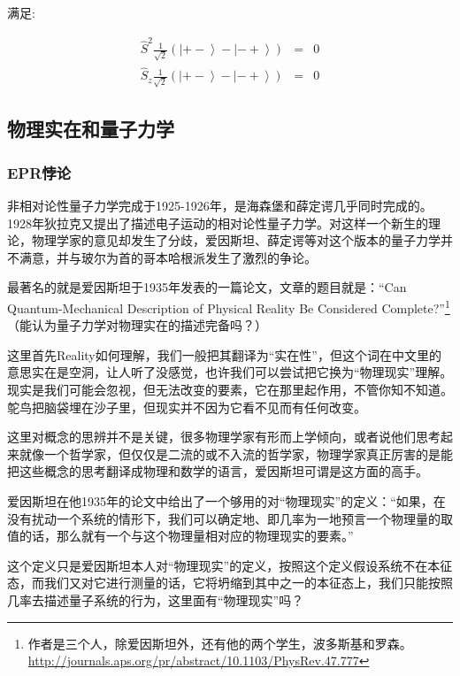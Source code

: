 满足:

\begin{eqnarray*}
  \hat S^2 \frac{1}{\sqrt 2}\left( \left|
{+-} \right\rangle - \left| {-+} \right\rangle \right) &=& 0 \\
  \hat S_z \frac{1}{\sqrt 2}\left( \left|
{+-} \right\rangle - \left| {-+} \right\rangle \right) &=& 0
\end{eqnarray*}


\subsection{物理实在和量子力学}

\subsubsection{EPR悖论}

非相对论性量子力学完成于1925-1926年，是海森堡和薛定谔几乎同时完成的。1928年狄拉克又提出了描述电子运动的相对论性量子力学。对这样一个新生的理论，物理学家的意见却发生了分歧，爱因斯坦、薛定谔等对这个版本的量子力学并不满意，并与玻尔为首的哥本哈根派发生了激烈的争论。

最著名的就是爱因斯坦于1935年发表的一篇论文，文章的题目就是：“Can Quantum-Mechanical Description of Physical Reality Be Considered Complete?”\footnote{作者是三个人，除爱因斯坦外，还有他的两个学生，波多斯基和罗森。\url{http://journals.aps.org/pr/abstract/10.1103/PhysRev.47.777}}（能认为量子力学对物理实在的描述完备吗？）

这里首先Reality如何理解，我们一般把其翻译为“实在性”，但这个词在中文里的意思实在是空洞，让人听了没感觉，也许我们可以尝试把它换为“物理现实”理解。现实是我们可能会忽视，但无法改变的要素，它在那里起作用，不管你知不知道。鸵鸟把脑袋埋在沙子里，但现实并不因为它看不见而有任何改变。

这里对概念的思辨并不是关键，很多物理学家有形而上学倾向，或者说他们思考起来就像一个哲学家，但仅仅是二流的或不入流的哲学家，物理学家真正厉害的是能把这些概念的思考翻译成物理和数学的语言，爱因斯坦可谓是这方面的高手。

爱因斯坦在他1935年的论文中给出了一个够用的对“物理现实”的定义：“如果，在没有扰动一个系统的情形下，我们可以确定地、即几率为一地预言一个物理量的取值的话，那么就有一个与这个物理量相对应的物理现实的要素。”

这个定义只是爱因斯坦本人对“物理现实”的定义，按照这个定义假设系统不在本征态，而我们又对它进行测量的话，它将坍缩到其中之一的本征态上，我们只能按照几率去描述量子系统的行为，这里面有“物理现实”吗？

